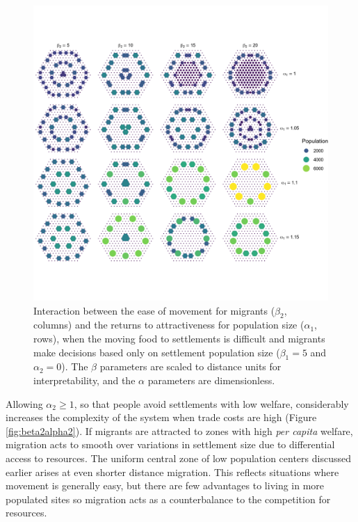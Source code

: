 \documentclass{article}
\begin{document}
\begin{figure}
    \centering
    \includegraphics[width = \linewidth]{images/beta2alpha1.png}
    \caption[Interaction between the ease of movement for migrants ($\beta_2$, columns) and the returns to attractiveness for population size ($\alpha_1$, rows)]{Interaction between the ease of movement for migrants ($\beta_2$, columns) and the returns to attractiveness for population size ($\alpha_1$, rows), when the moving food to settlements is difficult and migrants make decisions based only on settlement population size ($\beta_1 = 5$ and $\alpha_2 = 0$). The $\beta$ parameters are scaled to distance units for interpretability, and the $\alpha$ parameters are dimensionless.}
    \label{fig:beta2alpha1}
\end{figure}

Allowing $\alpha_2 \geq 1$, so that people avoid settlements with low welfare, considerably increases the complexity of the system when trade costs are high (Figure \ref{fig:beta2alpha2}). If migrants are attracted to zones with high \emph{per capita} welfare, migration acts to smooth over variations in settlement size due to differential access to resources. The uniform central zone of low population centers discussed earlier arises at even shorter distance migration. This reflects situations where movement is generally easy, but there are few advantages to living in more populated sites so migration acts as a counterbalance to the competition for resources.
\end{document}

